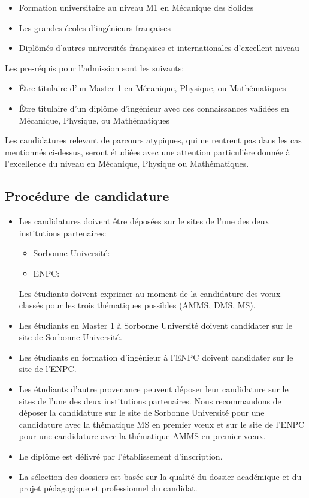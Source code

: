 \documentclass[french,11pt]{article}
\begin{document}
\begin{itemize}
\item
  Formation universitaire au niveau M1 en Mécanique des Solides 
\item
  Les grandes écoles d'ingénieurs françaises
\item
  Diplômés d'autres universités françaises et internationales
  d'excellent niveau
\end{itemize}
Les pre-réquis pour l’admission sont les suivants:
\begin{itemize}
\item
  Être titulaire d'un Master 1 en Mécanique, Physique, ou Mathématiques
\item
  Être titulaire d'un diplôme d'ingénieur avec des connaissances
  validées en Mécanique, Physique, ou Mathématiques
\end{itemize}
Les candidatures relevant de parcours atypiques, qui ne rentrent pas dans les cas 
mentionnés ci-dessus, seront étudiées avec une attention particulière donnée à l'excellence du niveau en Mécanique, Physique ou Mathématiques.


\subsection{Procédure de candidature}
%
%
\begin{itemize}
  \item
  Les candidatures doivent être déposées sur  le sites de l'une des deux institutions partenaires:
\begin{itemize}
  \item Sorbonne Université: 
  \item ENPC: 
\end{itemize}
Les étudiants doivent exprimer au moment de la candidature des vœux classés pour les trois thématiques possibles (AMMS, DMS, MS).

\item Les étudiants en Master 1 à Sorbonne Université doivent candidater sur le site de Sorbonne Université.

\item Les étudiants en formation d'ingénieur à l'ENPC doivent candidater sur le site de l'ENPC.

\item Les étudiants d'autre provenance peuvent déposer leur candidature sur le sites de l'une des deux institutions partenaires. Nous recommandons de 
déposer la candidature sur le site de Sorbonne Université pour une candidature avec la thématique MS en premier vœux et sur le site de l'ENPC pour une candidature avec la thématique AMMS en  premier vœux.

\item Le diplôme est délivré par l’établissement d’inscription. 

\item La sélection des dossiers est basée sur la qualité du dossier académique 
et du projet pédagogique et professionnel du candidat.  


\end{itemize}
\end{document}
